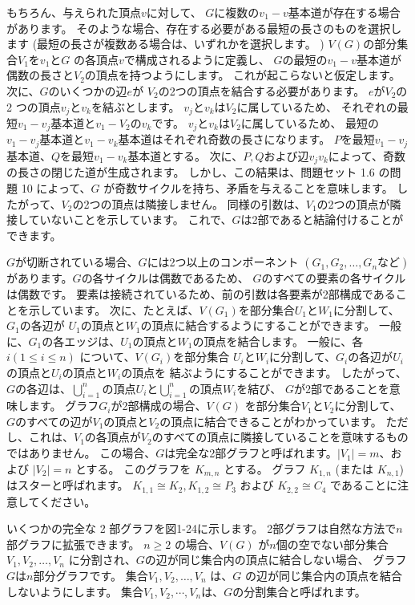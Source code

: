 もちろん、与えられた頂点$v$に対して、
$G$に複数の$v_1-v$基本道が存在する場合があります。
そのような場合、存在する必要がある最短の長さのものを選択します 
(最短の長さが複数ある場合は、いずれかを選択します。 )
$V(G)$の部分集合$V_1$を$v_1$と$G$ の各頂点$v$で構成されるように定義し、
$G$の最短の$v_1-v$基本道が偶数の長さと$V_2$の頂点を持つようにします。
これが起こらないと仮定します。 次に、$G$のいくつかの辺$e$が
$V_2$の2つの頂点を結合する必要があります。
$e$が$V_2$の2 つの頂点$v_j$と$v_k$を結ぶとします。
$v_j$と$v_k$は$V_2$に属しているため、
それぞれの最短$v_1-v_j$基本道と$v_1-V_2$の$v_k$です。
$v_j$と$v_k$は$V_2$に属しているため、
最短の$v_1-v_j$基本道と$v_1-v_k$基本道はそれぞれ奇数の長さになります。
$P$を最短$v_1-v_j$基本道、$Q$を最短$v_1-v_k$基本道とする。
次に、$P, Q$および辺$v_jv_k$によって、奇数の長さの閉じた道が生成されます。 
しかし、この結果は、問題セット 1.6 の問題 10 によって、$G$ が奇数サイクルを持ち、矛盾を与えることを意味します。
したがって、$V_2$の2つの頂点は隣接しません。 同様の引数は、$V_1$の2つの頂点が隣接していないことを示しています。
これで、$G$は2部であると結論付けることができます。

$G$が切断されている場合、$G$には2つ以上のコンポーネント
$(G_1, G_2, \dots, G_n など)$ があります。$G$の各サイクルは偶数であるため、
$G$のすべての要素の各サイクルは偶数です。 
要素は接続されているため、前の引数は各要素が2部構成であることを示しています。
次に、たとえば、$V(G_1)$を部分集合$U_1$と$W_1$に分割して、$G_1$の各辺が
$U_1$の頂点と$W_1$の頂点に結合するようにすることができます。
一般に、$G_1$の各エッジは、$U_1$の頂点と$W_1$の頂点を結合します。
一般に、各$i (1 \leq i \leq n)$ について、$V(G_i)$を部分集合
$U_i$と$W_i$に分割して、$G_i$の各辺が$U_i$の頂点と$U_i$の頂点と$W_i$の頂点を
結ぶようにすることができます。 したがって、$G$の各辺は、$\bigcup ^n_{i=1}$の頂点$U_i$と$\bigcup ^n_{i=1}$の頂点$W_i$を結び、
$G$が2部であることを意味します。
グラフ$G_i$が2部構成の場合、$V(G)$ を部分集合$V_1$と$V_2$に分割して、
$G$のすべての辺が$V_1$の頂点と$V_2$の頂点に結合できることがわかっています。
ただし、これは、$V_1$の各頂点が$V_2$のすべての頂点に隣接していることを意味するものではありません。
この場合、$G$は完全な2部グラフと呼ばれます。$|V_1| = m$、および $|V_2| = n$ とする。
このグラフを $K_{m,n}$ とする。 グラフ $K_{1,n}$ (または $K_{n,1}$) はスターと呼ばれます。 $K_{1,1} \cong K_{2}, K_{1, 2} \cong P_3$ および $K_{2,2} \cong C_4$ であることに注意してください。

いくつかの完全な 2 部グラフを図1-24に示します。
2部グラフは自然な方法で$n$部グラフに拡張できます。 
$n \geq 2$ の場合、$V(G)$ が$n$個の空でない部分集合
$V_1, V_2, \dots, V_n$ に分割され、$G$の辺が同じ集合内の頂点に結合しない場合、
グラフ$G$は$n$部分グラフです。 集合$V_1, V_2, \dots, V_n$ は、$G$ の辺が同じ集合内の頂点を結合しないようにします。
集合$V_1, V_2, \cdots, V_n$は、$G$の分割集合と呼ばれます。

